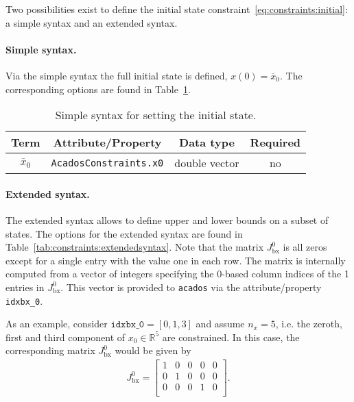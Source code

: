 \documentclass[english]{article}
\newcommand{\code}[1]{\texttt{#1}}
\newcommand{\acados}{\texttt{acados}}
\newcommand{\ind}[1]{_{\textrm{#1}}}
\newcommand{\initial}{^{\textrm{0}}}
\newcommand{\R}{\mathbb{R}}
\newcommand{\optional}{no}
\begin{document}
Two possibilities exist to define the initial state constraint~\eqref{eq:constraints:initial}: a simple syntax and an extended syntax.

\paragraph{Simple syntax.}
Via the simple syntax the full initial state is defined, $x(0)=\overline{x}_0$.
The corresponding options are found in Table~\ref{tab:constraints:simplesyntax}.
\begin{table}[ht!]
    \centering
    \begin{tabular}{cccc}
        \toprule
        Term & Attribute/Property & Data type & Required \\ \midrule
        $ \overline{x}_0 $ & \code{AcadosConstraints.x0} & double vector & \optional \\
        \bottomrule
    \end{tabular}
    \caption{Simple syntax for setting the initial state.} \label{tab:constraints:simplesyntax}
\end{table}
%
\paragraph{Extended syntax.}
The extended syntax allows to define upper and lower bounds on a subset of states.
The options for the extended syntax are found in Table~\ref{tab:constraints:extendedsyntax}.
Note that the matrix $J\ind{bx}\initial$ is all zeros except for a single entry with the value one in each row.
The matrix is internally computed from a vector of integers specifying the 0-based column indices of the 1 entries in $J\ind{bx}\initial$.
This vector is provided to \acados{} via the attribute/property \texttt{idxbx\_0}.

As an example, consider $\texttt{idxbx\_0} = [0, 1, 3]$ and assume $n_x = 5$, i.e. the zeroth, first and third component of $x_0 \in \R^5$ are constrained.
In this case, the corresponding matrix $J\ind{bx}\initial$ would be given by
\begin{align}
J\ind{bx}\initial = 
\begin{bmatrix}
1 & 0 & 0 & 0 & 0\\
0 & 1 & 0 & 0 & 0\\
0 & 0 & 0 & 1 & 0\\
\end{bmatrix}.
\end{align}
\end{document}
